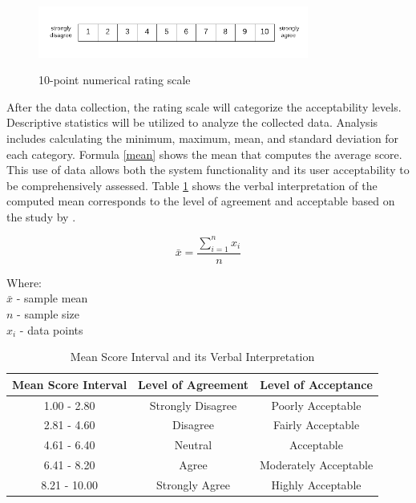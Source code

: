 	\begin{figure}[h!]
		\caption{10-point numerical rating scale}
		\centering
		\includegraphics[width=3.5in]{Nrs-10}
		\label{Nrs}
	\end{figure}
	
	After the data collection, the rating scale will categorize the acceptability levels. Descriptive statistics will be utilized to analyze the collected data. Analysis includes calculating the minimum, maximum, mean, and standard deviation for each category. Formula \ref{mean} shows the mean that computes the average score. This use of data allows both the system functionality and its user acceptability to be comprehensively assessed. Table \ref{Verbal} shows the verbal interpretation of the computed mean corresponds to the level of agreement and acceptable based on the study by \textcite{Eladia2024}. 
	
	
	\begin{equation} 
		\label{mean}
		\bar{x} = \frac{\sum_{i=1}^{n} x_{i}}{n}
	\end{equation}
	
	Where:
	\\$\bar{x}$ - sample mean
	\\$n$ - sample size
	\\$x_{i}$ - data points
	
	\begin{table}[h]
		\centering
		\caption{Mean Score Interval and its Verbal Interpretation}
		\label{Verbal}
			\begin{tabular}{|c|c|c|}
				\hline
				\multicolumn{1}{|c|}{\textbf{Mean Score Interval}} & 
				\multicolumn{1}{c|}{\textbf{Level of Agreement}} & 
				\multicolumn{1}{c|}{\textbf{Level of Acceptance}} \\ \hline
				1.00 - 2.80   & Strongly Disagree   & Poorly Acceptable            \\ \hline
				2.81 - 4.60               & Disagree   & Fairly Acceptable  \\ \hline
				4.61 - 6.40           & Neutral   & Acceptable \\ \hline
				6.41 - 8.20            & Agree   & Moderately Acceptable      \\ \hline
				8.21 - 10.00               & Strongly Agree      & Highly Acceptable\\ \hline
			\end{tabular}
	\end{table}
	
